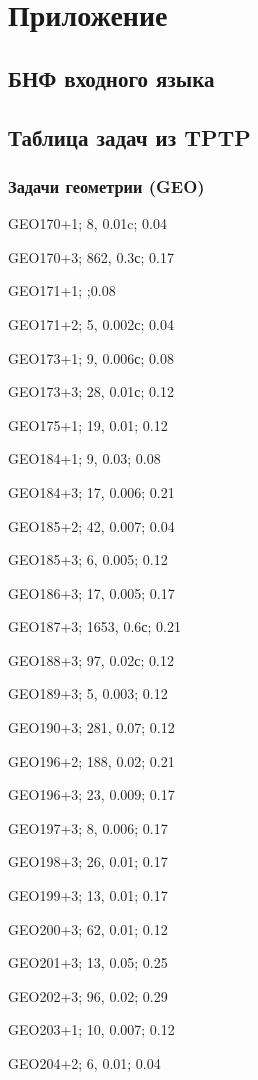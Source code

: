 \chapter*{Приложение}


\section*{БНФ входного языка}


\section*{Таблица задач из TPTP}

\subsection*{Задачи геометрии (GEO)}

GEO170+1; 8, 0.01c; 0.04

GEO170+3; 862, 0.3с; 0.17

GEO171+1; ;0.08

GEO171+2; 5, 0.002с; 0.04

GEO173+1; 9, 0.006с; 0.08

GEO173+3; 28, 0.01с; 0.12

GEO175+1; 19, 0.01; 0.12

GEO184+1; 9, 0.03; 0.08

GEO184+3; 17, 0.006; 0.21

GEO185+2; 42, 0.007; 0.04

GEO185+3; 6, 0.005; 0.12

GEO186+3; 17, 0.005; 0.17

GEO187+3; 1653, 0.6с; 0.21

GEO188+3; 97, 0.02с; 0.12

GEO189+3; 5, 0.003; 0.12

GEO190+3; 281, 0.07; 0.12

GEO196+2; 188, 0.02; 0.21

GEO196+3; 23, 0.009; 0.17

GEO197+3; 8, 0.006; 0.17

GEO198+3; 26, 0.01; 0.17

GEO199+3; 13, 0.01; 0.17

GEO200+3; 62, 0.01; 0.12

GEO201+3; 13, 0.05; 0.25

GEO202+3; 96, 0.02; 0.29

GEO203+1; 10, 0.007; 0.12

GEO204+2; 6, 0.01; 0.04 

